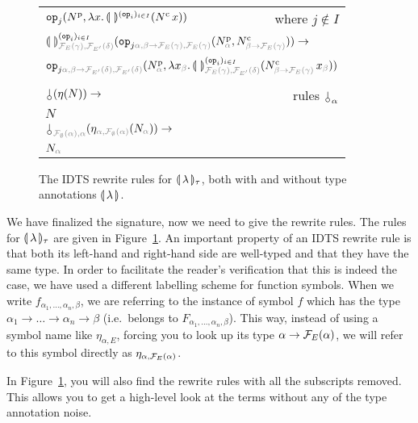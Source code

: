 \begin{figure}
\begin{tabular}{lr}
  $\mathtt{op}_j (N^{\mathrm{p}}, \lambda x.\, \llparenthesis \,  \, \rrparenthesis^{(\mathtt{op}_i)_{i \in I}} (N^{\mathrm{c}}\,x))$ & where $j \notin I$ \\
  \multicolumn{2}{l}{$\banana{}^{(\op{op}_i)_{i \in I}}_{\typehint{\FF_E(\gamma), \FF_{E'}(\delta)}} (\op{op}_{j \typehint{\alpha, \beta \to \FF_E(\gamma), \FF_E(\gamma)}} (N^{\mathrm{p}}_{\typehint{\alpha}}, N^{\mathrm{c}}_{\typehint{\beta \to \FF_E(\gamma)}})) \to$} \\
  \multicolumn{2}{l}{$\op{op}_{j \typehint{\alpha, \beta \to \FF_{E'}(\delta), \FF_{E'}(\delta)}} (N^{\mathrm{p}}_{\typehint{\alpha}}, \lam{x_{\typehint{\beta}}}{\banana{}^{(\op{op}_i)_{i \in I}}_{\typehint{\FF_E(\gamma), \FF_{E'}(\delta)}} (\ap{N^{\mathrm{c}}_{\typehint{\beta \to \FF_E(\gamma)}}}{x_{\typehint{\beta}}})})$} \\
  \\
  $\cherry (\eta (N)) \to$ & rules $\cherry_\alpha$ \\
  $N$ & \\
  \multicolumn{2}{l}{$\cherry_{\typehint{\FF_\emptyset(\alpha), \alpha}} (\eta_{\typehint{\alpha, \FF_\emptyset(\alpha)}} (N_{\typehint\alpha})) \to$} \\
  \multicolumn{2}{l}{$N_{\typehint\alpha}$}
  \end{tabular}
  
  \caption{\label{fig:tau-types} The IDTS rewrite rules for
    $\llparenthesis \, \lambda \, \rrparenthesis_\tau$, both with and without type annotations
    $\llparenthesis \, \lambda \, \rrparenthesis$.}
  
\end{figure}

We have finalized the signature, now we need to give the rewrite rules. The
rules for $\llparenthesis \, \lambda \, \rrparenthesis_\tau$ are given in
Figure~\ref{fig:tau-types}. An important property of an IDTS rewrite rule
is that both its left-hand and right-hand side are well-typed and that they
have the same type. In order to facilitate the reader's verification that
this is indeed the case, we have used a different labelling scheme for
function symbols. When we write $f_{\alpha_1,\ldots,\alpha_n,\beta}$, we
are referring to the instance of symbol $f$ which has the type
$\alpha_1 \to \ldots \to \alpha_n \to \beta$ (i.e.\ belongs to
$F_{\alpha_1,\ldots,\alpha_n,\beta}$). This way, instead of using a symbol
name like $\eta_{\alpha,E}$, forcing you to look up its type
$\alpha \to \mathcal{F}_E(\alpha)$, we will refer to this symbol directly as
$\eta_{\alpha,\mathcal{F}_E(\alpha)}$.

In Figure~\ref{fig:tau-types}, you will also find the rewrite rules with
all the subscripts removed. This allows you to get a high-level look at the
terms without any of the type annotation noise.

